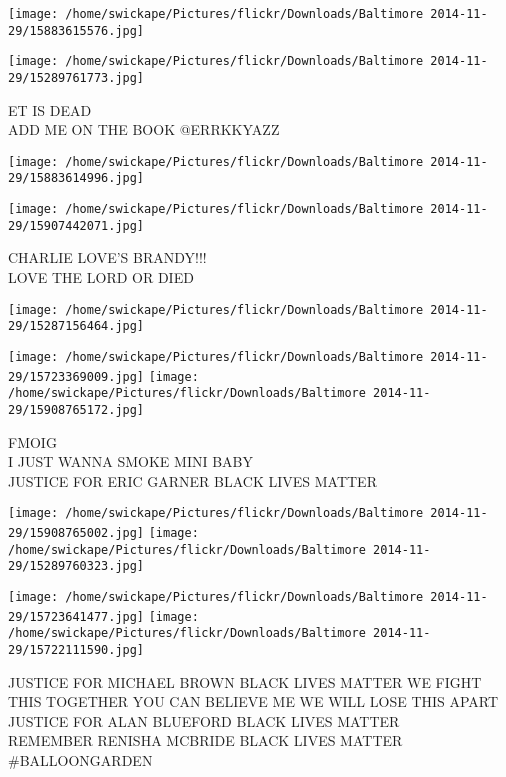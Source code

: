 \documentclass[10pt,letterpaper]{article}
\begin{document}
\texttt{[image: /home/swickape/Pictures/flickr/Downloads/Baltimore 2014-11-29/15883615576.jpg]}

\vspace{0.25in}
\texttt{[image: /home/swickape/Pictures/flickr/Downloads/Baltimore 2014-11-29/15289761773.jpg]}

ET IS DEAD\\
ADD ME ON THE BOOK @ERRKKYAZZ
\pagebreak

\texttt{[image: /home/swickape/Pictures/flickr/Downloads/Baltimore 2014-11-29/15883614996.jpg]}

\vspace{0.25in}
\texttt{[image: /home/swickape/Pictures/flickr/Downloads/Baltimore 2014-11-29/15907442071.jpg]}

CHARLIE LOVE'S BRANDY!!!\\
LOVE THE LORD OR DIED
\pagebreak

\texttt{[image: /home/swickape/Pictures/flickr/Downloads/Baltimore 2014-11-29/15287156464.jpg]}

\vspace{0.25in}
\texttt{[image: /home/swickape/Pictures/flickr/Downloads/Baltimore 2014-11-29/15723369009.jpg]}
\texttt{[image: /home/swickape/Pictures/flickr/Downloads/Baltimore 2014-11-29/15908765172.jpg]}

FMOIG\\
I JUST WANNA SMOKE MINI BABY\\
JUSTICE FOR ERIC GARNER BLACK LIVES MATTER
\pagebreak

\texttt{[image: /home/swickape/Pictures/flickr/Downloads/Baltimore 2014-11-29/15908765002.jpg]}
\texttt{[image: /home/swickape/Pictures/flickr/Downloads/Baltimore 2014-11-29/15289760323.jpg]}

\texttt{[image: /home/swickape/Pictures/flickr/Downloads/Baltimore 2014-11-29/15723641477.jpg]}
\texttt{[image: /home/swickape/Pictures/flickr/Downloads/Baltimore 2014-11-29/15722111590.jpg]}

JUSTICE FOR MICHAEL BROWN BLACK LIVES MATTER WE FIGHT THIS TOGETHER YOU CAN BELIEVE ME WE WILL LOSE THIS APART\\
JUSTICE FOR ALAN BLUEFORD BLACK LIVES MATTER\\
REMEMBER RENISHA MCBRIDE BLACK LIVES MATTER\\
\#BALLOONGARDEN
\pagebreak
\end{document}
